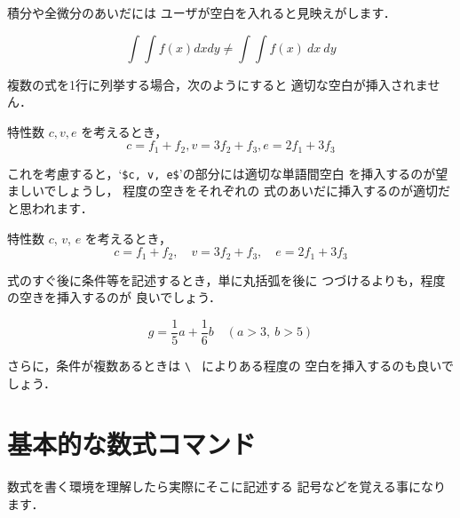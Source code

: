 積分\qu{$\int$}や全微分のあいだには
ユーザが空白を入れると見映えがします．
\begin{InOut}
\[ \int\int f(x)dxdy \neq 
   \int\!\!\!\int f(x)\ dx\ dy  \]
\end{InOut}


\begin{Exe}
複数の式を1行に列挙する場合，次のようにすると
適切な空白が挿入されません．
\begin{InOut}
特性数 $c, v, e$ を考えるとき，
\[c = f_1 + f_2, v = 3f_2 + 
      f_3, e = 2f_1 + 3f_3 \]
\end{InOut}

これを考慮すると，`\verb|$c, v, e$|'の部分には適切な単語間空白
を挿入するのが望ましいでしょうし，  程度の空きをそれぞれの
式のあいだに挿入するのが適切だと思われます．
\begin{InOut}
特性数 $c$, $v$, $e$ を考えるとき，
\[c = f_1 + f_2,\quad v = 3f_2
 + f_3, \quad e = 2f_1 + 3f_3 \]
\end{InOut}

\end{Exe}


\begin{Exe}
式のすぐ後に条件等を記述するとき，単に丸括弧を後に
つづけるよりも，程度の空きを挿入するのが
良いでしょう．

\begin{InOut}
\[ g = \frac{1}{5}a + \frac{1}{6}b 
     \quad (a>3,\ b>5) \]
\end{InOut}

さらに，条件が複数あるときは \verb*+\ + によりある程度の
空白を挿入するのも良いでしょう．
\end{Exe}

\section{基本的な数式コマンド}
数式を書く環境を理解したら実際にそこに記述する
記号などを覚える事になります．

